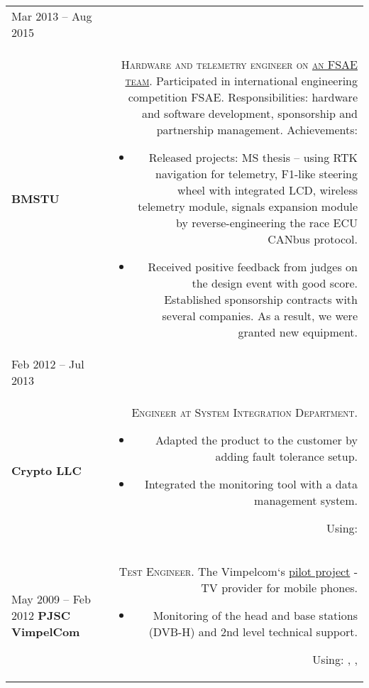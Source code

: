 \begin{tabular}{@{}L!{\VRule}R} 
    Mar 2013 -- Aug 2015                                                                                                       \\ {\bf BMSTU \\ } &
    {\textsc{Hardware and telemetry engineer on \href{https://baumanracing.ru/en/}{an FSAE team}.}}
    Participated in international engineering competition FSAE.
    Responsibilities: hardware and software development, sponsorship and partnership management.
    Achievements:
    \begin{itemize}
        \item Released projects: MS thesis -- using RTK navigation for telemetry, F1-like steering wheel with integrated LCD, wireless telemetry module, signals expansion module by reverse-engineering the race ECU CANbus protocol.
        \item Received positive feedback from judges on the design event with good score. Established sponsorship contracts with several companies. As a result, we were granted new equipment.
    \end{itemize}                                                                                              \\
    Feb 2012 -- Jul 2013                                                                                                       \\ {\bf Crypto LLC \\ } &
    {\textsc{Engineer at System Integration Department.}}
    \begin{itemize}
        \item Adapted the product to the customer by adding fault tolerance setup.
        \item Integrated the monitoring tool with a data management system.
    \end{itemize}
    Using:                                                                                                                \\
    May 2009 -- Feb 2012 {\bf PJSC VimpelCom} &
    {\textsc{Test Engineer.}} The Vimpelcom`s \href{https://www.dvb.org/news/russia-to-launch-dvb-h-services}{pilot project} - TV provider for mobile phones.
    \begin{itemize}
        \item Monitoring of the head and base stations (DVB-H) and 2nd level technical support.
    \end{itemize}
    Using: , ,          
\end{tabular}